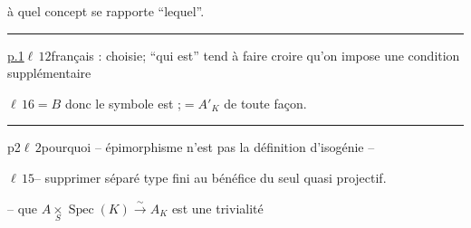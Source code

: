 à quel concept se rapporte ``lequel''.

\rule{\linewidth}{0.3pt}

\uline{p.1}\quad $\ell\,12$\quad français : choisie\quad ; ``qui est'' tend à faire croire qu'on impose une condition supplémentaire

$\ell\,16$\quad $=B$ donc le symbole est ;\quad $=A'_K$ de toute façon.

\rule{\linewidth}{0.3pt}

p2\quad $\ell\,2$\quad pourquoi
\quad -- épimorphisme n'est pas la définition d'isogénie --

$\ell\,15$\quad -- supprimer séparé type fini au bénéfice du seul quasi projectif.

-- que $A\mathbin{\underset{S}{\times}}\operatorname{Spec}(K)\xrightarrow{\sim}A_K$ est une trivialité

